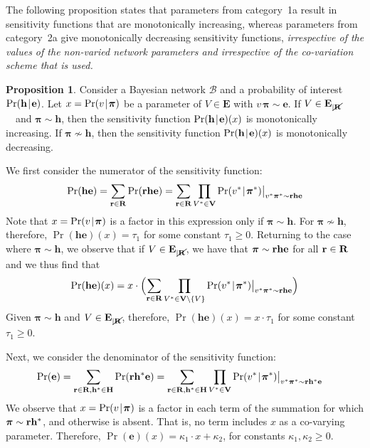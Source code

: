 \documentclass[10pt,a4paper]{paper}
\theoremstyle{definition}
\newtheorem{prop}[theorem]{Proposition}
\newcommand{\bpi}{\boldsymbol\pi}
\newcommand{\vbpi}{\boldsymbol\pi}
\newcommand{\ct}[1]{\tau_{#1}}
\newcommand{\cn}[1]{\kappa_{#1}}
\newcommand{\hyp}{\mathbf{h}}
\newcommand{\ev}{\mathbf{e}}
\newcommand{\evs}{\mathbf{E}}
\newcommand{\restr}{_{|\cancel{\bf R}}}
\newcommand{\giv}[1]{\big\vert_{#1}}
\newcommand{\newmid}{\hspace{0.9pt}\vert\hspace{0.9pt}}
\begin{document}
The following proposition states that parameters from category~1a result in sensitivity functions that are monotonically increasing, whereas parameters from category~2a give monotonically decreasing sensitivity functions, \emph{irrespective of the values of the non-varied network parameters and irrespective of the co-variation scheme that is used.}  

\begin{prop}\label{mono1}
Consider a Bayesian network ${\mathcal B}$ and a probability of interest $\Pr(\hyp\newmid \ev)$. Let $x=\Pr(v\newmid \bpi)$ be a parameter of\/ $V\in\evs$ with $v\,\bpi\sim\ev$. 
If\/ $V\in\evs\restr$~~and $\bpi\sim\hyp$, then the sensitivity function $\Pr(\hyp\newmid \ev)(x)$ is monotonically increasing. If\/ $\bpi\nsim\hyp$, then the sensitivity function 
$\Pr(\hyp\newmid \ev)(x)$ is monotonically decreasing. 
\end{prop}

We first consider the numerator of the sensitivity function:
\begin{equation}\label{eq:numerator}
\Pr(\hyp\ev)= \sum_{{\bf r}\in{\bf R}}\Pr({\bf r}\hyp\ev) = 
\sum_{{\bf r}\in{\bf R}} \prod_{V^*\in {\bf V}} \Pr(v^* \newmid \vbpi^*)\giv{v^*\vbpi^*\sim {\bf r}\hyp\ev}
\end{equation} 
Note that $x=\Pr(v\newmid \bpi)$ is a factor in this expression only if $\bpi \sim \hyp$. For $\bpi \nsim \hyp$, therefore, $\Pr(\hyp\ev)(x) = \ct{1}$ for some constant $\ct{1} \geq 0$. 
%
Returning to the case where $\bpi \sim \hyp$, we observe that if $V\in\evs\restr$, we  have that $\bpi\sim {\bf r}\hyp\ev$ for all ${{\bf r}\in{\bf R}}$ and we thus find that
\vspace{4pt}
\begin{equation*}
\Pr(\hyp\ev)(x)= x\cdot 
\Bigl(
\sum_{{\bf r}\in{\bf R}} \prod_{V^*\in {\bf V}\setminus\{V\}} \Pr(v^* \newmid \vbpi^*)\giv{v^*\vbpi^*\sim {\bf r}\hyp\ev} 
\Bigr)
\end{equation*}
Given $\bpi\sim\hyp$ and $V \in \evs\restr$, therefore, $\Pr(\hyp\ev)(x) = x\cdot\ct{1}$ for some constant $\ct{1} \geq 0$. 

Next, we consider the denominator of the sensitivity function:
\begin{align}
\Pr(\ev)&=\sum_{{\bf r}\in{\bf R},{{\bf h^*}\in{\bf H}}}\Pr({\bf r}\hyp^*\ev)
=\sum_{{\bf r}\in{\bf R},{{\bf h^*}\in{\bf H}}} \prod_{V^*\in {\bf V}} \Pr(v^*\newmid \vbpi^*)\giv{v^*\vbpi^*\sim {\bf r}\hyp^*\ev}\label{eq:denominator}
\end{align}
We observe that $x=\Pr(v\newmid \bpi)$ is a factor in each term of the summation for which $\bpi\sim{\bf r}\hyp^*$, and otherwise is absent. That is, no term includes $x$ as a co-varying parameter. Therefore, $\Pr(\ev)(x) = \cn{1}\cdot x + \cn{2}$, for constants $\cn{1},\cn{2} \geq 0$.  
\end{document}
